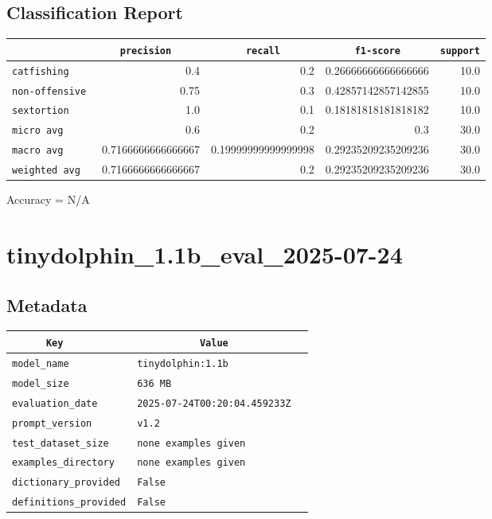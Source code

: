 \documentclass{article}
\begin{document}
\subsection{Classification Report}

\begin{center}
\begin{tabular}{l | r | r | r | r} \hline
    \verb|            | & \verb|    precision     | & \verb|      recall      | & \verb|     f1-score     | & \verb|support| \\ \hline
    \hline
    \verb|catfishing | & 0.4 & 0.2 & 0.26666666666666666 &    10.0 \\ \hline
    \verb|non-offensive| & 0.75 & 0.3 & 0.42857142857142855 &    10.0 \\ \hline
    \verb|sextortion | & 1.0 & 0.1 & 0.18181818181818182 &    10.0 \\ \hline
    \verb|micro avg  | & 0.6 & 0.2 & 0.3 &    30.0 \\ \hline
    \verb|macro avg  | & 0.7166666666666667 & 0.19999999999999998 & 0.29235209235209236 &    30.0 \\ \hline
    \verb|weighted avg| & 0.7166666666666667 & 0.2 & 0.29235209235209236 &    30.0 \\ \hline
\end{tabular}
\end{center}

\begin{center}
Accuracy = N/A
\end{center}

\section{tinydolphin\_1.1b\_eval\_2025-07-24}
\subsection{Metadata}

\begin{center}
\begin{tabular}{l | l} \hline
    \verb|      Key      | & \verb|           Value           | \\ \hline
    \hline
    \verb|model_name    | & \verb|tinydolphin:1.1b             | \\ \hline
    \verb|model_size    | & \verb|636 MB                       | \\ \hline
    \verb|evaluation_date| & \verb|2025-07-24T00:20:04.459233Z  | \\ \hline
    \verb|prompt_version| & \verb|v1.2                         | \\ \hline
    \verb|test_dataset_size| & \verb|none examples given          | \\ \hline
    \verb|examples_directory| & \verb|none examples given          | \\ \hline
    \verb|dictionary_provided| & \verb|False                        | \\ \hline
    \verb|definitions_provided| & \verb|False                        | \\ \hline
\end{tabular}
\end{center}
\end{document}
